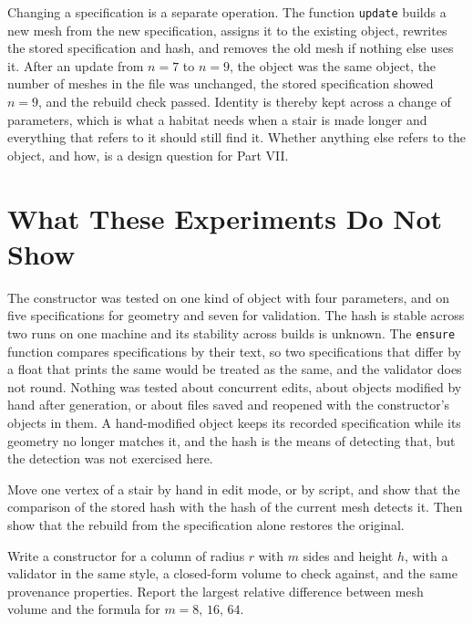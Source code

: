 Changing a specification is a separate operation. The function \texttt{update} builds a new mesh from the new specification, assigns it to the existing object, rewrites the stored specification and hash, and removes the old mesh if nothing else uses it. After an update from $n=7$ to $n=9$, the object was the same object, the number of meshes in the file was unchanged, the stored specification showed $n=9$, and the rebuild check passed. Identity is thereby kept across a change of parameters, which is what a habitat needs when a stair is made longer and everything that refers to it should still find it. Whether anything else refers to the object, and how, is a design question for Part VII.

\section{What These Experiments Do Not Show}

The constructor was tested on one kind of object with four parameters, and on five specifications for geometry and seven for validation. The hash is stable across two runs on one machine and its stability across builds is unknown. The \texttt{ensure} function compares specifications by their text, so two specifications that differ by a float that prints the same would be treated as the same, and the validator does not round. Nothing was tested about concurrent edits, about objects modified by hand after generation, or about files saved and reopened with the constructor's objects in them. A hand-modified object keeps its recorded specification while its geometry no longer matches it, and the hash is the means of detecting that, but the detection was not exercised here.

\begin{exercise}
Move one vertex of a stair by hand in edit mode, or by script, and show that the comparison of the stored hash with the hash of the current mesh detects it. Then show that the rebuild from the specification alone restores the original.
\end{exercise}

\begin{exercise}
Write a constructor for a column of radius $r$ with $m$ sides and height $h$, with a validator in the same style, a closed-form volume to check against, and the same provenance properties. Report the largest relative difference between mesh volume and the formula for $m=8,\,16,\,64$.
\end{exercise}

